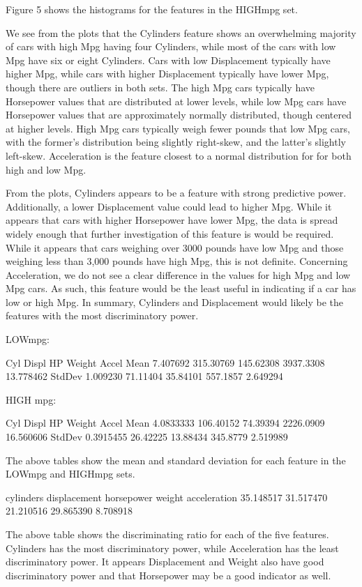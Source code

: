 \documentclass{homework}
\begin{document}
Figure 5 shows the histograms for the features in the HIGHmpg set.

\question
We see from the plots that the Cylinders feature shows an overwhelming majority of cars with high Mpg having four Cylinders, while most of the cars with low Mpg have six or eight Cylinders. Cars with low Displacement typically have higher Mpg, while cars with higher Displacement typically have lower Mpg, though there are outliers in both sets. The high Mpg cars typically have Horsepower values that are distributed at lower levels, while low Mpg cars have Horsepower values that are approximately normally distributed, though centered at higher levels. High Mpg cars typically weigh fewer pounds that low Mpg cars, with the former's distribution being slightly right-skew, and the latter's slightly left-skew. Acceleration is the feature closest to a normal distribution for for both high and low Mpg. 

From the plots, Cylinders appears to be a feature with strong predictive power. Additionally, a lower Displacement value could lead to higher Mpg. While it appears that cars with higher Horsepower have lower Mpg, the data is spread widely enough that further investigation of this feature is would be required.
While it appears that cars weighing over 3000 pounds have low Mpg and those weighing less than 3,000 pounds have high Mpg, this is not definite.
Concerning Acceleration, we do not see a clear difference in the values for high Mpg and low Mpg cars. As such, this feature would be the least useful in indicating if a car has low or high Mpg. In summary, Cylinders and Displacement would likely be the features with the most discriminatory power.

\question
LOWmpg:
\begin{rc}
            Cyl     Displ        HP    Weight     Accel
Mean   7.407692 315.30769 145.62308 3937.3308 13.778462
StdDev 1.009230  71.11404  35.84101  557.1857  2.649294
\end{rc}
HIGH mpg:
\begin{rc}
             Cyl     Displ       HP    Weight     Accel
Mean   4.0833333 106.40152 74.39394 2226.0909 16.560606
StdDev 0.3915455  26.42225 13.88434  345.8779  2.519989
\end{rc}

The above tables show the mean and standard deviation for each feature in the LOWmpg and HIGHmpg sets.
\question
\begin{rc}
   cylinders displacement   horsepower       weight acceleration 
   35.148517    31.517470    21.210516    29.865390     8.708918 
\end{rc}
The above table shows the discriminating ratio for each of the five features. Cylinders has the most discriminatory power, while Acceleration has the least discriminatory power. It appears Displacement and Weight also have good discriminatory power and that Horsepower may be a good indicator as well.
\end{document}
